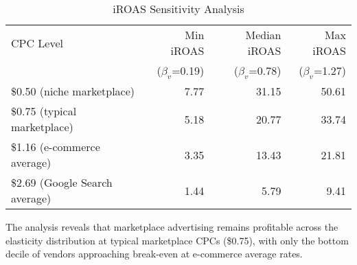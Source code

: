 \begin{table}[htbp!]
\centering
\caption{iROAS Sensitivity Analysis}
\begin{tabular}{lrrr}
\toprule
CPC Level & Min iROAS & Median iROAS & Max iROAS \\
& ($\beta_v$=0.19) & ($\beta_v$=0.78) & ($\beta_v$=1.27) \\
\midrule
\$0.50 (niche marketplace) & 7.77 & 31.15 & 50.61 \\
\$0.75 (typical marketplace) & 5.18 & 20.77 & 33.74 \\
\$1.16 (e-commerce average) & 3.35 & 13.43 & 21.81 \\
\$2.69 (Google Search average) & 1.44 & 5.79 & 9.41 \\
\bottomrule
\end{tabular}
\end{table}

The analysis reveals that marketplace advertising remains profitable across the elasticity distribution at typical marketplace CPCs (\$0.75), with only the bottom decile of vendors approaching break-even at e-commerce average rates.